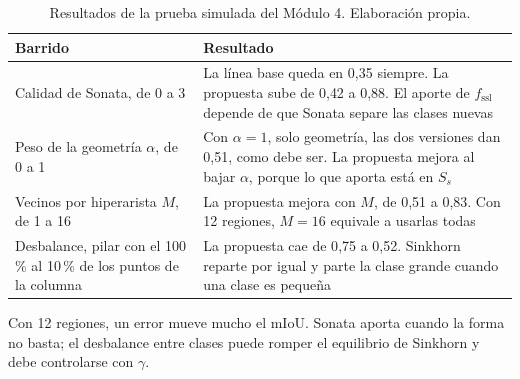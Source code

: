 \begin{table}[!htbp]
\centering
{}
\caption[Resultados de la prueba simulada del Módulo 4]{Resultados de la prueba simulada del Módulo 4. Elaboración propia.}
\label{tab:m4-escenarios}
\begin{tabularx}{\linewidth}{@{}>{\raggedright\arraybackslash\hsize=0.7\hsize}X>{\raggedright\arraybackslash\hsize=1.3\hsize}X@{}}
\toprule
\textbf{Barrido} & \textbf{Resultado} \\
\midrule
Calidad de Sonata, de 0 a 3 & La línea base queda en 0{,}35 siempre. La propuesta sube de 0{,}42 a 0{,}88. El aporte de $f_{\mathrm{ssl}}$ depende de que Sonata separe las clases nuevas \\
Peso de la geometría $\alpha$, de 0 a 1 & Con $\alpha=1$, solo geometría, las dos versiones dan 0{,}51, como debe ser. La propuesta mejora al bajar $\alpha$, porque lo que aporta está en $S_s$ \\
Vecinos por hiperarista $M$, de 1 a 16 & La propuesta mejora con $M$, de 0{,}51 a 0{,}83. Con 12 regiones, $M=16$ equivale a usarlas todas \\
Desbalance, pilar con el 100\,\% al 10\,\% de los puntos de la columna & La propuesta cae de 0{,}75 a 0{,}52. Sinkhorn reparte por igual y parte la clase grande cuando una clase es pequeña \\
\bottomrule
\end{tabularx}
\end{table}

Con 12 regiones, un error mueve mucho el mIoU. Sonata aporta cuando la forma no
basta; el desbalance entre clases puede romper el equilibrio de Sinkhorn y debe
controlarse con $\gamma$.
